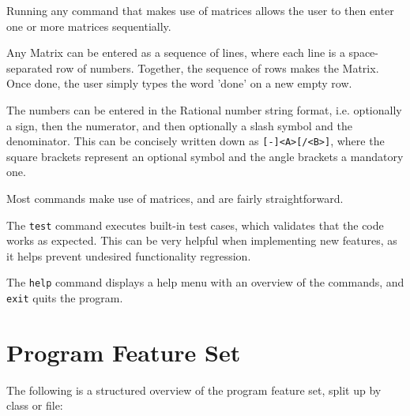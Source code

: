 \documentclass[11pt, a4paper]{article}
\begin{document}
Running any command that makes use of matrices allows the user to then enter one or more matrices sequentially.

Any Matrix can be entered as a sequence of lines, where each line is a space-separated row of numbers.
Together, the sequence of rows makes the Matrix.
Once done, the user simply types the word 'done' on a new empty row.

The numbers can be entered in the Rational number string format, i.e. optionally a sign, then the numerator, and then optionally a slash symbol and the denominator.
This can be concisely written down as \texttt{[-]<A>[/<B>]}, where the square brackets represent an optional symbol and the angle brackets a mandatory one.

Most commands make use of matrices, and are fairly straightforward.

The \texttt{test} command executes built-in test cases, which validates that the code works as expected.
This can be very helpful when implementing new features, as it helps prevent undesired functionality regression.

The \texttt{help} command displays a help menu with an overview of the commands, and \texttt{exit} quits the program.



\section{Program Feature Set}

The following is a structured overview of the program feature set, split up by class or file:
\end{document}
